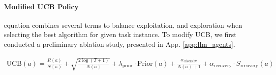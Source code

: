 
\paragraph{Modified UCB Policy} equation combines several terms to balance exploitation, and exploration when selecting the best algorithm for given task instance. To modify UCB, we first conducted a preliminary ablation study, presented in App. \ref{app:llm_agents}.

\begin{align*}
\mathrm{UCB}(a) = \frac{R(a)}{N(a)} + \sqrt{\frac{2 \log(T + 1)}{N(a)}} + \lambda_{\mathrm{prior}} \cdot \mathrm{Prior}(a) + \frac{\alpha_{\mathrm{diversity}}}{N(a) + 1} + \alpha_{\mathrm{recovery}} \cdot S_{\mathrm{recovery}}(a)
\end{align*}

